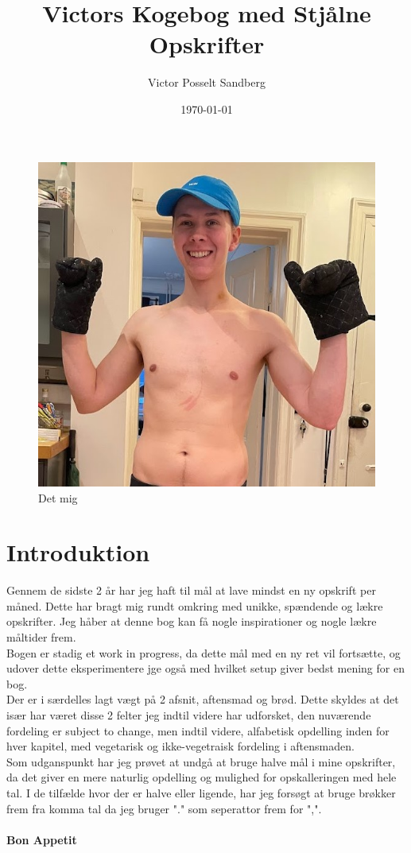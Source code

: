 \documentclass{book}
\title{Victors Kogebog med Stjålne Opskrifter}
\author{Victor Posselt Sandberg}
\date{\today}
\begin{document}
\dominitoc  

\frontmatter
\maketitle 
\begin{figure}
    \centering
    \includegraphics[width=1\linewidth]{Billeder/Mave2.jpg}
    \caption{Det mig}
\end{figure}
\newpage \tableofcontents
\mainmatter
\newpage\chapter{Introduktion} 
Gennem de sidste 2 år har jeg haft til mål at lave mindst en ny opskrift per måned. Dette har bragt mig rundt omkring med unikke, spændende og lækre opskrifter. Jeg håber at denne bog kan få nogle inspirationer og nogle lækre måltider frem. 
\\Bogen er stadig et work in progress, da dette mål med en ny ret vil fortsætte, og udover dette eksperimentere jge også med hvilket setup giver bedst mening for en bog.
\\ Der er i særdelles lagt vægt på 2 afsnit, aftensmad og brød. Dette skyldes at det især har været disse 2 felter jeg indtil videre har udforsket, den nuværende fordeling er subject to change, men indtil videre, alfabetisk opdelling inden for hver kapitel, med vegetarisk og ikke-vegetraisk fordeling i aftensmaden. \\ Som udganspunkt har jeg prøvet at undgå at bruge halve mål i mine opskrifter, da det giver en mere naturlig opdelling og mulighed for opskalleringen med hele tal. I de tilfælde hvor der er halve eller ligende, har jeg forsøgt at bruge brøkker frem fra komma tal da jeg bruger "." som seperattor frem for ",". 
\\ \\ \textbf{Bon Appetit} 
\end{document}
